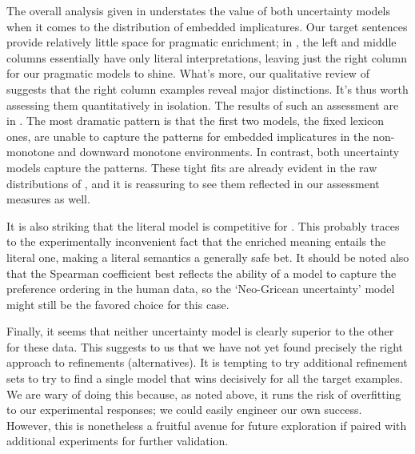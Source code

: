\documentclass[leqno,12pt]{article}
\begin{document}
The overall analysis given in  understates the
value of both uncertainty models when it comes to the distribution of
embedded implicatures. Our target sentences provide relatively little
space for pragmatic enrichment; in , the left
and middle columns essentially have only literal interpretations,
leaving just the right column for our pragmatic models to
shine. What's more, our qualitative review of
 suggests that the right column examples
reveal major distinctions. It's thus worth assessing them
quantitatively in isolation. The results of such an assessment are in
.  The most dramatic pattern is that the
first two models, the fixed lexicon ones, are unable to capture the
patterns for embedded implicatures in the non-monotone and downward
monotone environments. In contrast, both uncertainty models capture
the patterns. These tight fits are already evident in the raw
distributions of , and it is reassuring to
see them reflected in our assessment measures as well.

It is also striking that the literal model is competitive for
. This probably traces to the experimentally
inconvenient fact that the enriched meaning entails the literal one,
making a literal semantics a generally safe bet. It should be noted
also that the Spearman coefficient best reflects the ability of a
model to capture the preference ordering in the human data, so the
`Neo-Gricean uncertainty' model might still be the favored choice for
this case.

Finally, it seems that neither uncertainty model is clearly superior
to the other for these data.  This suggests to us that we have not yet
found precisely the right approach to refinements (alternatives). It
is tempting to try additional refinement sets to try to find a single
model that wins decisively for all the target examples. We are wary of
doing this because, as noted above, it runs the risk of overfitting to
our experimental responses; we could easily engineer our own success.
However, this is nonetheless a fruitful avenue for future exploration
if paired with additional experiments for further validation.
\end{document}
